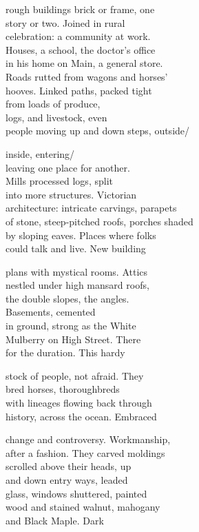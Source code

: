 \documentclass[twoside,10pt]{book}
\begin{document}
rough buildings brick or frame, one\\
story or two. Joined in rural\\
celebration: a community at work.\\
Houses, a school, the doctor's office\\
in his home on Main, a general store.\\
Roads rutted from wagons and horses'\\
hooves. Linked paths, packed tight\\
from loads of produce,\\
logs, and livestock, even\\
people moving up and down steps, outside/

inside, entering/\\
leaving one place for another.\\
Mills processed logs, split\\
into more structures. Victorian\\
architecture: intricate carvings, parapets\\
of stone, steep-pitched roofs, porches shaded\\
by sloping eaves. Places where folks\\
could talk and live. New building

plans with mystical rooms. Attics\\
nestled under high mansard roofs,\\
the double slopes, the angles.\\
Basements, cemented\\
in ground, strong as the White\\
Mulberry on High Street. There\\
for the duration. This hardy

stock of people, not afraid. They\\
bred horses, thoroughbreds\\
with lineages flowing back through\\
history, across the ocean. Embraced

change and controversy. Workmanship,\\
after a fashion. They carved moldings\\
scrolled above their heads, up\\
and down entry ways, leaded\\
glass, windows shuttered, painted\\
wood and stained walnut, mahogany\\
and Black Maple. Dark
\end{document}
